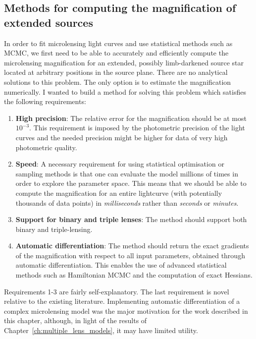 \documentclass[12pt,dvipsnames]{report}
\begin{document}
\subsection{Methods for computing the magnification of extended sources}
In order to fit microlensing light curves and use statistical methods such as
MCMC, we first need to be able to accurately and efficiently compute the
microlensing magnification for an extended, possibly limb-darkened source star 
located at arbitrary positions in the source plane. There are no analytical
solutions to this problem. The only option is to estimate the magnification numerically.
I wanted to build a method for solving this problem which satisfies the following
requirements:
\begin{enumerate}
    \item \textbf{High precision}:
         The relative error for the magnification should be 
         at most $10^{-3}$. This requirement is imposed by the photometric
          precision of the light curves and the needed precision might be higher for data of
          very high photometric quality.
    \item \textbf{Speed}: A necessary requirement for using statistical
          optimisation or sampling methods is that one can evaluate the model millions 
          of times in order to explore the parameter space. This
          means that we should be able to compute the magnification for an entire
          lightcurve (with potentially thousands of data points) in \emph{milliseconds}
          rather than \emph{seconds} or \emph{minutes}.
    \item  \textbf{Support for binary and triple lenses}: The method should support both 
        binary and triple-lensing.
    \item \textbf{Automatic differentiation}: The method should return the exact gradients 
            of the magnification with respect
          to all input parameters, obtained through automatic differentiation. This
          enables the use of advanced statistical methods such as Hamiltonian MCMC and
          the computation of exact Hessians.
\end{enumerate}
Requirements 1-3 are fairly self-explanatory. The last requirement is novel relative to 
the existing literature. Implementing automatic differentiation of a complex microlensing model was the 
major motivation for the work described in this chapter, although, in light of the results 
of Chapter~\ref{ch:multiple_lens_models}, it may have limited utility.
\end{document}
